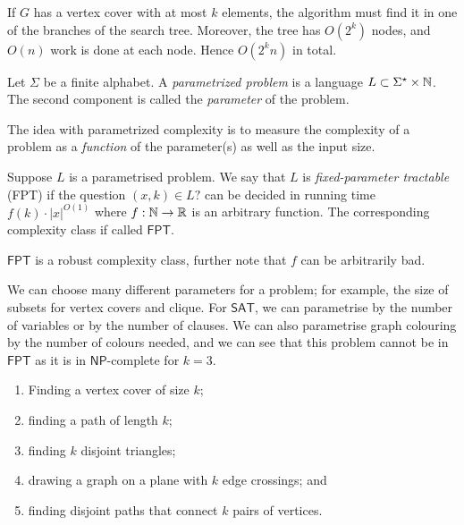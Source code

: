 \begin{remark}
	If $G$ has a vertex cover with at most
	$k$ elements, the algorithm must find it in one of the branches
	of the search tree.
	Moreover, the tree has $O(2^k)$ nodes,
	and $O(n)$ work is done at each node.
	Hence $O(2^k n)$ in total.
\end{remark}

\begin{definition}
	Let $\Sigma$ be a finite alphabet.
	A \emph{parametrized problem} 
	is a language $L \subset \Sigma^\star \times \mathbb{N}$.
	The second component is called the \emph{parameter} of the problem.
\end{definition}

The idea with parametrized complexity is to measure the complexity of a problem
as a \emph{function} of the parameter(s) as well as the input size.

\begin{definition}
	Suppose $L$ is a parametrised problem.
	We say that $L$ is \emph{fixed-parameter tractable} (FPT)
	if the question $(x,k) \in L?$ can be decided in running time
	$f(k) \cdot \left\lvert x \right\rvert^{O(1)}$
	where $f: \mathbb{N} \to \mathbb{R}$ is an arbitrary function.
	The corresponding complexity class if called $\mathsf{FPT}$.
\end{definition}

$\mathsf{FPT}$ is a robust complexity class,
further note that $f$ can be arbitrarily bad.

We can choose many different parameters for a problem;
for example, the size of subsets for vertex covers
and clique.
For $\mathsf{SAT}$, we can parametrise by
the number of variables or by the number of clauses.
We can also parametrise graph colouring by the number of colours
needed, and we can see that this problem cannot be in $\mathsf{FPT}$
as it is in $\mathsf{NP}$-complete for $k = 3$.

\begin{examples}
	\begin{enumerate}
		\item Finding a vertex cover of size $k$;
		\item finding a path of length $k$;
		\item finding $k$ disjoint triangles;
		\item drawing a graph on a plane with $k$ edge crossings; and
		\item finding disjoint paths that connect $k$ pairs of vertices.
	\end{enumerate}
\end{examples}

